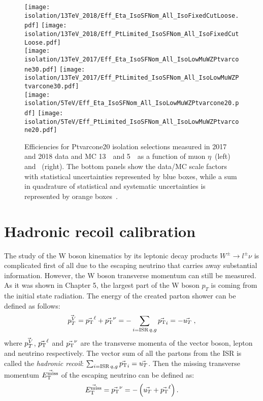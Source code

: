 	\begin{figure}[pt]
		\begin{center}
			\texttt{[image: isolation/13TeV\_2018/Eff\_Eta\_IsoSFNom\_All\_IsoFixedCutLoose.pdf]}
			\texttt{[image: isolation/13TeV\_2018/Eff\_PtLimited\_IsoSFNom\_All\_IsoFixedCutLoose.pdf]}\\
			\texttt{[image: isolation/13TeV\_2017/Eff\_Eta\_IsoSFNom\_All\_IsoLowMuWZPtvarcone30.pdf]}
			\texttt{[image: isolation/13TeV\_2017/Eff\_PtLimited\_IsoSFNom\_All\_IsoLowMuWZPtvarcone30.pdf]}\\
			\texttt{[image: isolation/5TeV/Eff\_Eta\_IsoSFNom\_All\_IsoLowMuWZPtvarcone20.pdf]}
			\texttt{[image: isolation/5TeV/Eff\_PtLimited\_IsoSFNom\_All\_IsoLowMuWZPtvarcone20.pdf]}
			\caption{Efficiencies for Ptvarcone20 isolation selections measured in 2017 and 2018 data and MC 13~\TeV\  and 5~\TeV\ as a function of muon $\eta$~(left) and \pt~(right). The bottom panels show the data/MC scale factors with statistical uncertainties represented by blue boxes, while a sum in quadrature of statistical and systematic uncertainties is represented by orange boxes~\cite{int_note_muons}.}
			\label{fig:iso-sf-13TeV-2018}
		\end{center}
	\end{figure}
	
	\clearpage

     \section{Hadronic recoil calibration}
     The study of the W boson kinematics by its leptonic decay products $W^{\pm}\rightarrow l^{\pm} \nu$ is complicated first of all due to the escaping neutrino that carries away substantial information. However, the W boson transverse momentum can still be measured. As it was shown in Chapter 5, the largest part of the W boson $p_T$ is coming from the initial state radiation. The energy of the created parton shower can be defined as follows:
	\begin{equation}
	\vec{p_{T}^{V}}=\vec{p_{\text{T}}}^{\ell}+\vec{p_{\text{T}}}^{\nu} = -\sum_{i=\mathrm{ISR}\, q,g} \vec{p_{\text{T}}}_i = -\vec{u_{T}}\;,
	\end{equation}
	where $\vec{p_{T}^{V}}$, $\vec{p_{\text{T}}}^{\ell}$ and $\vec{p_{\text{T}}}^{\nu}$ are the transverse momenta of the vector boson, lepton and neutrino respectively. The vector sum of all the partons from the ISR is called the \textit{hadronic recoil}: $\sum_{i=\mathrm{ISR}\, q,g} \vec{p_{\text{T}}}_i = \vec{u_{T}}$. Then the missing transverse momentum $\vec{E_{\text{T}}^{\text{miss}}} $ of the escaping neutrino can be defined as:
	\begin{equation}\label{eq:METandNeutrino}
	\vec{E_{\text{T}}^{\text{miss}}} = \vec{p_{\text{T}}}^{\nu} = -\left(\vec{u_{T}}+\vec{p_{\text{T}}}^\ell\right).
	\end{equation}

